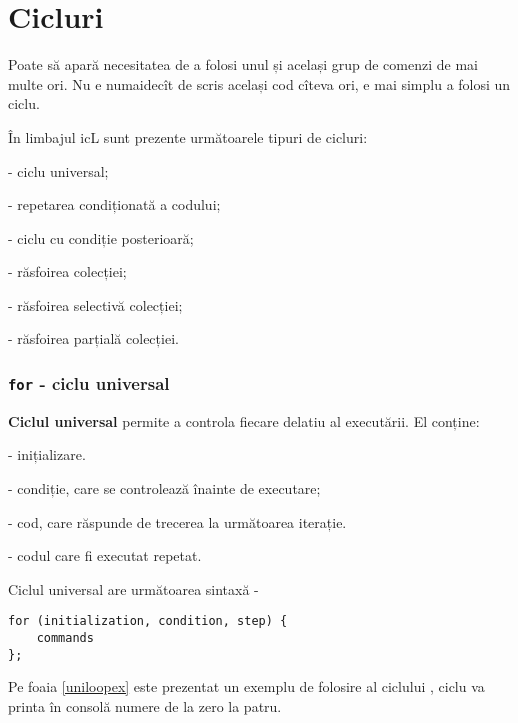 \section{Cicluri}

Poate să apară necesitatea de a folosi unul și același grup de comenzi de mai multe ori. Nu e numaidecît de scris același cod cîteva ori, e mai simplu a folosi un ciclu.

În limbajul icL sunt prezente următoarele tipuri de cicluri:

\begin{icItems}
\item
	 - ciclu universal;
\item
	 - repetarea condiționată a codului;
\item
	 - ciclu cu condiție posterioară;
\item
	 - răsfoirea colecției;
\item
	 - răsfoirea selectivă colecției;
\item
	 - răsfoirea parțială colecției.
\end{icItems}


\subsubsection{\lstinline|for| - ciclu universal}

{\bf Ciclul universal} permite a controla fiecare delatiu al executării. El conține:

\begin{icItems}
\item
	 - inițializare.
\item
	 - condiție, care se controlează înainte de executare;
\item
	 - cod, care răspunde de trecerea la următoarea iterație.
\item
	 - codul care fi executat repetat.
\end{icItems}

Ciclul universal are următoarea sintaxă -
\begin{lstlisting}[numbers=none]
for (initialization, condition, step) {
	commands
};
\end{lstlisting}

Pe foaia \ref{uniloopex} este prezentat un exemplu de folosire al ciclului , ciclu va printa în consolă numere de la zero la patru.

